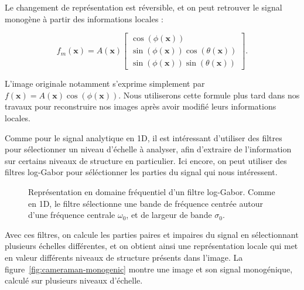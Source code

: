 Le changement de représentation est réversible, et on peut retrouver le signal monogène à partir des informations locales :

\begin{equation}
    f_m(\mathbf{x}) = A(\mathbf{x})\left[
        \begin{array}{c}
        \cos(\phi(\mathbf{x})) \\
        \sin(\phi(\mathbf{x}))\cos(\theta(\mathbf{x})) \\
        \sin(\phi(\mathbf{x}))\sin(\theta(\mathbf{x}))
        \end{array}
    \right].
\end{equation}

L'image originale notamment s'exprime simplement par $f(\mathbf{x}) = A(\mathbf{x})\cos(\phi(\mathbf{x}))$. Nous utiliserons cette formule plus tard dans nos travaux pour reconstruire nos images après avoir modifié leurs informations locales.

\bigskip

Comme pour le signal analytique en 1D, il est intéressant d'utiliser des filtres pour sélectionner un niveau d'échelle à analyser, afin d'extraire de l'information sur certains niveaux de structure en particulier. Ici encore, on peut utiliser des filtres log-Gabor pour séléctionner les parties du signal qui nous intéressent.

\bigskip

\begin{figure}
    \centering

    \caption[Filtre log-Gabor en 2D]{Représentation en domaine fréquentiel d'un filtre log-Gabor. Comme en 1D, le filtre sélectionne une bande de fréquence centrée autour d'une fréquence centrale $\omega_0$, et de largeur de bande $\sigma_0$.}
    \label{fig:2D-log-gabor}
\end{figure}

Avec ces filtres, on calcule les parties paires et impaires du signal en sélectionnant plusieurs échelles différentes, et on obtient ainsi une représentation locale qui met en valeur différents niveaux de structure présents dans l'image. La figure~\ref{fig:cameraman-monogenic} montre une image et son signal monogénique, calculé sur plusieurs niveaux d'échelle.

